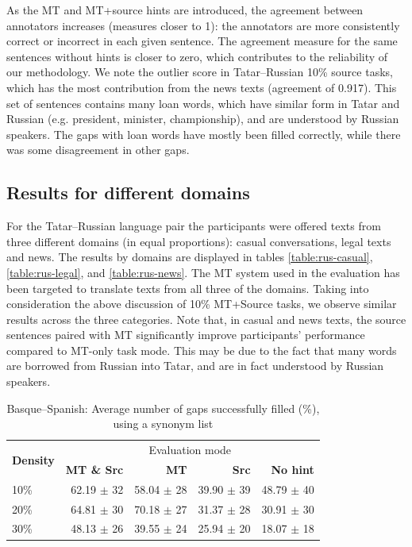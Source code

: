 \documentclass[11pt]{article}
\begin{document}
As the MT and MT+source hints are introduced, the agreement between annotators increases (measures closer to 1): the annotators are more consistently correct or incorrect in each given sentence. The agreement measure for the same sentences without hints is closer to zero, which contributes to the reliability of our methodology. We note the outlier score in Tatar--Russian 10\% source tasks, which has the most contribution from the news texts (agreement of 0.917). This set of sentences contains many loan words, which have similar form in Tatar and Russian (e.g. president, minister, championship), and are understood by Russian speakers. The gaps with loan words have mostly been filled correctly, while there was some disagreement in other gaps.



\subsection{Results for different domains}
For the Tatar--Russian language pair the participants were offered texts from three different domains (in equal proportions): casual conversations, legal texts and news. The results by domains are displayed in tables \ref{table:rus-casual}, \ref{table:rus-legal}, and \ref{table:rus-news}. The MT system used in the evaluation has been targeted to translate texts from all three of the domains. Taking into consideration the above discussion of 10\% MT+Source tasks, we observe similar results across the three categories. Note that, in casual and news texts, the source sentences paired with MT significantly improve participants' performance compared to MT-only task mode. This may be due to the fact that many words are borrowed from Russian into Tatar, and are in fact understood by Russian speakers.


\begin{table}
\centering
  \begin{tabular}{|l|r|r|r|r|}
  \hline
 \multirow{2}{*}{\textbf{Density}} & \multicolumn{4}{|c|}{Evaluation mode} \\\cline{2-5}
                                            & \textbf{MT \& Src} & \textbf{MT} & \textbf{Src} & \textbf{No hint} \\
\hline
10\%&62.19 \(\pm\) 32&58.04 \(\pm\) 28&39.90 \(\pm\) 39&48.79 \(\pm\) 40\\
20\%&64.81 \(\pm\) 30&70.18 \(\pm\) 27&31.37 \(\pm\) 28&30.91 \(\pm\) 30\\
30\%&48.13 \(\pm\) 26&39.55 \(\pm\) 24&25.94 \(\pm\) 20&18.07 \(\pm\) 18\\
\hline
\end{tabular}
\caption {Basque--Spanish: Average number of gaps successfully filled (\%), using a synonym list} 
\label{table:res-eus-spa}
\end{table}
\end{document}

